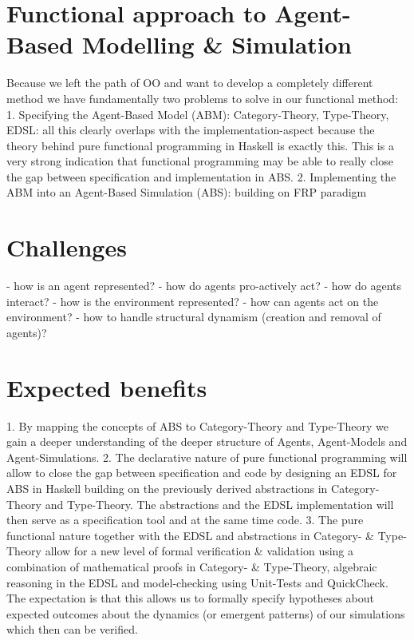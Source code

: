 \section{Functional approach to Agent-Based Modelling \& Simulation}
Because we left the path of OO and want to develop a completely different method we have fundamentally two problems to solve in our functional method:
1. Specifying the Agent-Based Model (ABM): Category-Theory, Type-Theory, EDSL: all this clearly overlaps with the  implementation-aspect because the theory behind pure functional programming in Haskell is exactly this. This is a very strong indication that functional programming may be able to really close the gap between specification and implementation in ABS.
2. Implementing the ABM into an Agent-Based Simulation (ABS): building on FRP paradigm

\section{Challenges}
- how is an agent represented?
- how do agents pro-actively act?
- how do agents interact?
- how is the environment represented?
- how can agents act on the environment?
- how to handle structural dynamism (creation and removal of agents)?

\section{Expected benefits}
1. By mapping the concepts of ABS to Category-Theory and Type-Theory we gain a deeper understanding of the deeper structure of Agents, Agent-Models and Agent-Simulations.
2. The declarative nature of pure functional programming will allow to close the gap between specification and code by designing an EDSL for ABS in Haskell building on the previously derived abstractions in Category-Theory and Type-Theory. The abstractions and the EDSL implementation will then serve as a specification tool and at the same time code.
3. The pure functional nature together with the EDSL and abstractions in Category- \& Type-Theory allow for a new level of formal verification \& validation using a combination of mathematical proofs in Category- \& Type-Theory, algebraic reasoning in the EDSL and model-checking using Unit-Tests and QuickCheck. The expectation is that this allows us to formally specify hypotheses about expected outcomes about the dynamics (or emergent patterns) of our simulations which then can be verified.

